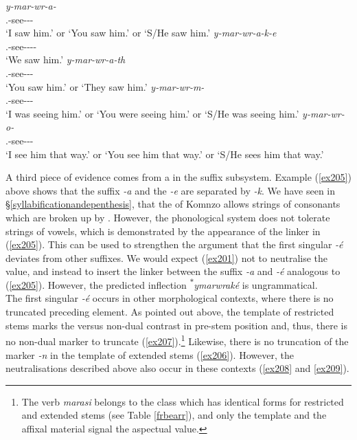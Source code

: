 \begin{exe}
\ex
\begin{xlist}
	\ex
	\gll \emph{y-mar-wr-a-\Zero{}}\\
	\Tsg.\Masc-see-\Ndu-\Pst-\Sg\\
	\trans `I saw him.' or `You saw him.' or `S/He saw him.'
	\label{ex201}
	\ex
	\gll \emph{y-mar-wr-a-k-e}\\
	\Tsg.\Masc-see-\Ndu-\Pst-\Lk-\Fnsg\\
	\trans `We saw him.'
	\label{ex205}
	\ex
	\gll \emph{y-mar-wr-a-th}\\
	\Tsg.\Masc-see-\Ndu-\Pst-\Stnsg\\
	\trans `You saw him.' or `They saw him.'
	\label{ex203}
	\ex
	\gll \emph{y-mar-wr-m-\Zero{}}\\
	\Tsg.\Masc-see-\Ndu-\Dur-\Sg\\
	\trans `I was seeing him.' or `You were seeing him.' or `S/He was seeing him.'
	\label{ex202}
	\ex
	\gll \emph{y-mar-wr-o-\Zero{}}\\
	\Tsg.\Masc-see-\Ndu-\Andat-\Sg\\
	\trans `I see him that way.' or `You see him that way.' or `S/He sees him that way.'
	\label{ex214}
\end{xlist}
\end{exe}

A third piece of evidence comes from a  in the suffix subsystem. Example (\ref{ex205}) above shows that the  suffix \emph{-a} and the \Fnsg{} \emph{-e} are separated by \emph{-k}. We have seen in \S{}\ref{syllabificationandepenthesis}, that the  of Komnzo allows strings of consonants which are broken up by . However, the phonological system does not tolerate strings of vowels, which is demonstrated by the appearance of the linker in (\ref{ex205}). This can be used to strengthen the argument that the first singular \emph{-é} deviates from other suffixes. We would expect (\ref{ex201}) not to neutralise the  value, and instead to insert the linker between the  suffix \emph{-a} and \emph{-é} analogous to (\ref{ex205}). However, the predicted inflection \textsuperscript{$\ast$}\emph{ymarwraké} is ungrammatical.\\

The first singular \emph{-é} occurs in other morphological contexts, where there is no truncated preceding element. As pointed out above, the template of restricted stems marks the  versus non-dual contrast in pre-stem position and, thus, there is no non-dual marker to truncate (\ref{ex207}).\footnote{The verb \emph{marasi} belongs to the class which has identical forms for restricted and extended stems (see Table \ref{frbearr}), and only the template and the affixal material signal the aspectual value.} Likewise, there is no truncation of the  marker \emph{-n} in the template of extended stems (\ref{ex206}). However, the  neutralisations described above also occur in these contexts (\ref{ex208} and \ref{ex209}).


